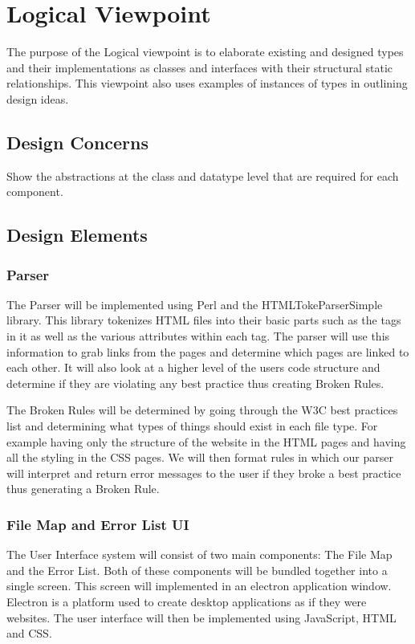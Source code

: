 \documentclass[letterpaper,10pt,titlepage,draftclsnofoot,onecolumn,onesided] {IEEEtran}
\begin{document}
	
	
\section{Logical Viewpoint}
The purpose of the Logical viewpoint is to elaborate existing and designed types and their implementations
as classes and interfaces with their structural static relationships. This viewpoint also uses examples of
instances of types in outlining design ideas. 
\subsection{Design Concerns}
Show the abstractions at the class and datatype level that are required for each component. 
\subsection{Design Elements}


	\subsubsection{Parser}
	The Parser will be implemented using Perl and the HTMLTokeParserSimple library\cite{htmltokeparser}.
	This library tokenizes HTML files into their basic parts such as the tags in it as well as the various attributes within each tag.
	The parser will use this information to grab links from the pages and determine which pages are linked to each other.
	It will also look at a higher level of the users code structure and determine if they are violating any best practice thus creating Broken Rules. 
	
	The Broken Rules will be determined by going through the W3C best practices list and determining what types of things should exist in each file type. For example having only the structure of the website in the HTML pages and having all the styling in the CSS pages. We will then format rules in which our parser will interpret and return error messages to the user if they broke a best practice thus generating a Broken Rule.\cite{w3c}
	

	\subsubsection{File Map and Error List UI}
	The User Interface system will consist of two main components: The File Map and the Error List. 
	Both of these components will be bundled together into a single screen. 
	This screen will implemented in an electron application window. 
	Electron is a platform used to create desktop applications as if they were websites.
	The user interface will then be implemented using JavaScript, HTML and CSS.
	
\end{document}
